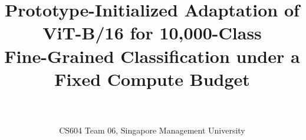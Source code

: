 \documentclass[10pt,twocolumn,letterpaper]{article}
\title{Prototype-Initialized Adaptation of ViT-B/16 for 10,000-Class\\Fine-Grained Classification under a Fixed Compute Budget}
\author{\todo{Member 1 (student ID)} \qquad \todo{Member 2 (student ID)}\\
\todo{Member 3 (student ID)} \qquad \todo{Member 4 (student ID)}\\
CS604 Team 06, Singapore Management University\\
{\tt\small \todo{email addresses}}
}
\begin{document}
\maketitle






{
    \small
    
    
}


\end{document}
